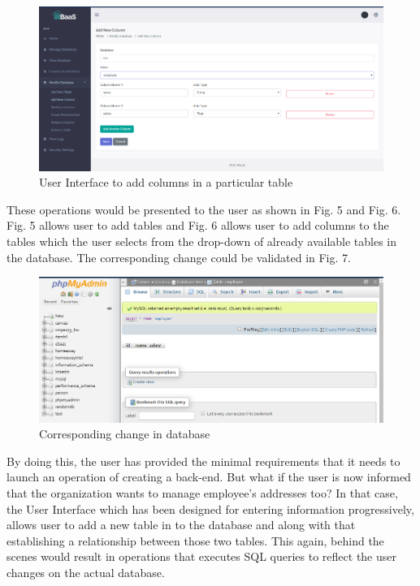 \documentclass[letterpaper, 10 pt, conference]{ieeeconf}
\begin{document}
\begin{figure}[h]
   \centering
   \includegraphics[scale=0.17]{./fig4.png}
   \caption{User Interface to add columns in a particular table}
   \label{fig:my_label}
\end{figure}

These operations would be presented to the user as shown in Fig. 5 and Fig. 6. Fig. 5 allows user to add tables and Fig. 6 allows user to add columns to the tables which the user selects from the drop-down of already available tables in the database. The corresponding change could be validated in Fig. 7.

\begin{figure}[h]
   \centering
   \includegraphics[scale=0.17]{./fig5.png}
   \caption{Corresponding change in database}
   \label{fig:my_label}
\end{figure}

By doing this, the user has provided the minimal requirements that it needs to launch an operation of creating a back-end. But what if the user is now informed that the organization wants to manage employee’s addresses too? In that case, the User Interface which has been designed for entering information progressively, allows user to add a new table in to the database and along with that establishing a relationship between those two tables. This again, behind the scenes would result in operations that executes SQL queries to reflect the user changes on the actual database.
\end{document}
